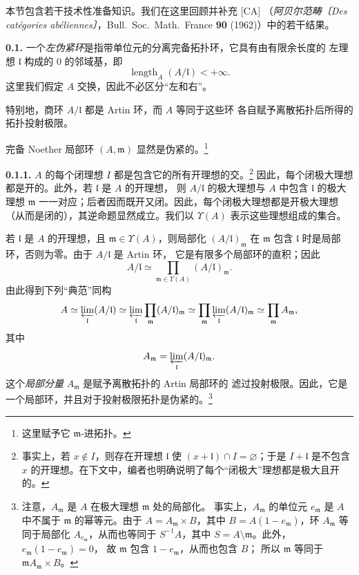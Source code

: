 本节包含若干技术性准备知识。我们在这里回顾并补充 \textup{[CA]}
（\emph{阿贝尔范畴〔Des cat\'egories ab\'eliennes〕}，Bull.\ Soc.\ Math.\ France
\textbf{90} (1962)）中的若干结果。

\medskip
\noindent\textbf{0.1.}
\label{sga3:VIIB:0.1}
一个\emph{左伪紧环}是指带单位元的分离完备拓扑环，它具有由有限余长度的
左理想 \(\mathfrak l\) 构成的 \(0\) 的邻域基，即
\[
  \operatorname{length}_A(A/\mathfrak l)<+\infty.
\]
这里我们假定 \(A\) 交换，因此不必区分“左和右”。

特别地，商环 \(A/\mathfrak l\) 都是 Artin 环，而 \(A\) 等同于这些环
各自赋予离散拓扑后所得的拓扑投射极限。

完备 Noether 局部环 \((A,\mathfrak m)\) 显然是伪紧的。\footnote{这里赋予它 \(\mathfrak m\)-进拓扑。}

\medskip
\noindent\textbf{0.1.1.}
\label{sga3:VIIB:0.1.1}
\(A\) 的每个闭理想 \(I\) 都是包含它的所有开理想的交。\footnote{事实上，若 \(x\notin I\)，则存在开理想 \(\mathfrak l\) 使
\((x+\mathfrak l)\cap I=\varnothing\)；于是 \(I+\mathfrak l\) 是不包含
\(x\) 的开理想。在下文中，编者也明确说明了每个“闭极大”理想都是极大且开的。}
因此，每个闭极大理想都是开的。此外，若 \(\mathfrak l\) 是 \(A\) 的开理想，
则 \(A/\mathfrak l\) 的极大理想与 \(A\) 中包含 \(\mathfrak l\) 的极大理想
\(\mathfrak m\) 一一对应；后者因而既开又闭。因此，每个闭极大理想都是开极大理想
（从而是闭的），其逆命题显然成立。我们以 \(\Upsilon(A)\) 表示这些理想组成的集合。

若 \(\mathfrak l\) 是 \(A\) 的开理想，且
\(\mathfrak m\in\Upsilon(A)\)，则局部化
\((A/\mathfrak l)_{\mathfrak m}\) 在 \(\mathfrak m\) 包含
\(\mathfrak l\) 时是局部环，否则为零。由于 \(A/\mathfrak l\) 是 Artin 环，
它是有限多个局部环的直积；因此
\[
  A/\mathfrak l
  \simeq
  \prod_{\mathfrak m\in\Upsilon(A)}
    (A/\mathfrak l)_{\mathfrak m}.
\]
由此得到下列“典范”同构
\[
  A
  \simeq \varprojlim_{\mathfrak l}(A/\mathfrak l)
  \simeq \varprojlim_{\mathfrak l}
    \prod_{\mathfrak m}(A/\mathfrak l)_{\mathfrak m}
  \simeq \prod_{\mathfrak m}
    \varprojlim_{\mathfrak l}(A/\mathfrak l)_{\mathfrak m}
  \simeq \prod_{\mathfrak m}A_{\mathfrak m},
\]
其中
\[
  A_{\mathfrak m}
  =
  \varprojlim_{\mathfrak l}(A/\mathfrak l)_{\mathfrak m}.
\]
这个\emph{局部分量} \(A_{\mathfrak m}\) 是赋予离散拓扑的 Artin 局部环的
滤过投射极限。因此，它是一个局部环，并且对于投射极限拓扑是伪紧的。\footnote{注意，\(A_{\mathfrak m}\) 是 \(A\) 在极大理想 \(\mathfrak m\) 处的局部化。
事实上，\(A_{\mathfrak m}\) 的单位元 \(e_{\mathfrak m}\) 是 \(A\) 中不属于
\(\mathfrak m\) 的幂等元。由于 \(A=A_{\mathfrak m}\times B\)，其中
\(B=A(1-e_{\mathfrak m})\)，环 \(A_{\mathfrak m}\) 等同于局部化
\(A_{e_{\mathfrak m}}\)，从而也等同于 \(S^{-1}A\)，其中
\(S=A\setminus\mathfrak m\)。此外，\(e_{\mathfrak m}(1-e_{\mathfrak m})=0\)，
故 \(\mathfrak m\) 包含 \(1-e_{\mathfrak m}\)，从而也包含 \(B\)；
所以 \(\mathfrak m\) 等同于 \(\mathfrak mA_{\mathfrak m}\times B\)。}

